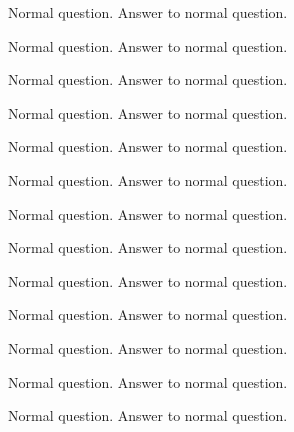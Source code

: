 \documentclass{../../flashcards}
\begin{document}
\begin{card}{Normal question.}
Answer to normal question.
\end{card}


\begin{card}{Normal question.}
Answer to normal question.
\end{card}


\begin{card}{Normal question.}
Answer to normal question.
\end{card}


\begin{card}{Normal question.}
Answer to normal question.
\end{card}


\begin{card}{Normal question.}
Answer to normal question.
\end{card}


\begin{card}{Normal question.}
Answer to normal question.
\end{card}


\begin{card}{Normal question.}
Answer to normal question.
\end{card}


\begin{card}{Normal question.}
Answer to normal question.
\end{card}


\begin{card}{Normal question.}
Answer to normal question.
\end{card}


\begin{card}{Normal question.}
Answer to normal question.
\end{card}


\begin{card}{Normal question.}
Answer to normal question.
\end{card}


\begin{card}{Normal question.}
Answer to normal question.
\end{card}


\begin{card}{Normal question.}
Answer to normal question.
\end{card}

\listofcard
\printindex
\end{document}

